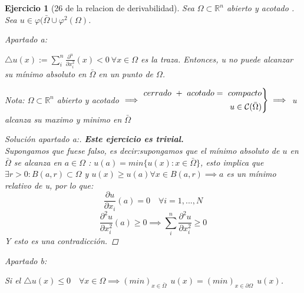 \documentclass[11pt, a4paper, titlepage]{article}
\newcommand{\R}{\mathbb{R}}
\theoremstyle{exercise-style}
\newtheorem*{ejer}{Ejercicio}
\theoremstyle{theorem-style}
\newenvironment{rcases}
  {\left.\begin{aligned}}
  {\end{aligned}\right\rbrace}
\begin{document}
\begin{ejer}[26 de la relacion de derivabilidad]
	Sea $\Omega \subset \R^n$ abierto y acotado . Sea $u \in \varphi(\bar{\Omega} \cup \varphi^2(\Omega)$.
	
	Apartado a:
	
	$\triangle u(x):= \sum_i^n \frac{\partial^u}{\partial x_i^2}(x) < 0 \ \forall x \in \Omega$ es la traza. Entonces, u no puede alcanzar su mínimo absoluto en $\bar{\Omega}$ en un punto de $\Omega$.
	
Nota:
	$\Omega \subset \R^n$ abierto y acotado $\implies \begin{rcases}
	cerrado \ + \ acotado = \ compacto \\
	u \in \mathcal{C}(\bar{\Omega})
\end{rcases}\implies $ u alcanza su maximo y minimo en $\bar{\Omega}$


\begin{proof}[Solución apartado a:] \textbf{Este ejercicio es trivial.}\\
	Supongamos que fuese falso, es decir:supongamos que el mínimo absoluto de $u$ en $\bar{\Omega}$ se alcanza en $a\in \Omega$ : $u(a) = min\{u(x): x \in \bar{\Omega}\}$, esto implica que $\exists r > 0 : B(a,r) \subset \Omega $ y $u(x) \geq u(a) \forall x \in B(a,r) \implies a$ es un mínimo relativo de u, por lo que:
	\[
	\frac{\partial u}{\partial x_i}(a) = 0 \quad \forall i = 1,...,N
	\]
	\[
	\frac{\partial^2 u}{\partial x_i^2}(a) \geq 0 \implies \sum_i^n \frac{\partial^2u}{\partial x_i^2} \geq 0
	\]
	Y esto es una contradicción.
\end{proof} 

Apartado b:

Si el $\triangle u(x) \leq 0 \quad \forall x \in \Omega \implies (min)_{x\in \bar{\Omega}} \ \ u(x) = (min)_{x \in \partial \Omega}  \ \ u(x)$.


\end{ejer}
\end{document}
